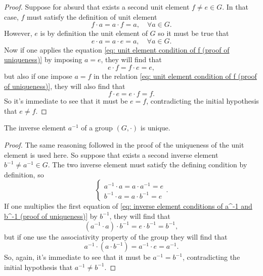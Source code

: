 \begin{proof}
    Suppose for absurd that exists a second unit element $f \neq e \in G$. In that case, $f$ must satisfy the definition of unit element
    \begin{equation}
    \label{eq: unit element condition of f (proof of uniqueness)}
        f\cdot a = a \cdot f = a,\quad \forall a\in G.
    \end{equation}
    However, $e$ is by definition the unit element of $G$ so it must be true that
    \begin{equation}
    \label{eq: unit element condition of e (proof of uniqueness)}
        e \cdot a = a \cdot e = a,\quad \forall a\in G.
    \end{equation}
    Now if one applies the equation \eqref{eq: unit element condition of f (proof of uniqueness)} by imposing $a = e$, they will find that
    \begin{equation}
        e\cdot f = f \cdot e = e,
    \end{equation}
    but also if one impose $a = f$ in the relation \eqref{eq: unit element condition of f (proof of uniqueness)}, they will also find that
    \begin{equation}
        f \cdot e = e \cdot f = f.
    \end{equation}
    So it's immediate to see that it must be $e = f$, contradicting the initial hypothesis that $e \neq f$.
\end{proof}
\begin{corl}
    The inverse element $a^{-1}$ of a group $(G,\cdot)$ is unique.
\end{corl}
\begin{proof}
    The same reasoning followed in the proof of the uniqueness of the unit element is used here. So suppose that exists a second inverse element $b^{-1} \neq a^{-1} \in G$. The two inverse element must satisfy the defining condition by definition, so
    \begin{equation}
    \label{eq: inverse element conditions of a^-1 and b^-1 (proof of uniqueness)}
        \begin{cases}
            a^{-1} \cdot a = a \cdot a^{-1} = e \\
            b^{-1} \cdot a = a \cdot b^{-1} = e
        \end{cases}.
    \end{equation}
    If one multiplies the first equation of \eqref{eq: inverse element conditions of a^-1 and b^-1 (proof of uniqueness)} by $b^{-1}$, they will find that
    \begin{equation}
        (a^{-1} \cdot a) \cdot b^{-1}  = e \cdot b^{-1} = b^{-1},
    \end{equation}
    but if one use the associativity property of the group they will find that 
    \begin{equation}
        a^{-1} \cdot (a \cdot b^{-1}) = a^{-1} \cdot e = a^{-1}.
    \end{equation}
    So, again, it's immediate to see that it must be $a^{-1} = b^{-1}$, contradicting the initial hypothesis that $a^{-1} \neq b^{-1}$.
\end{proof}

